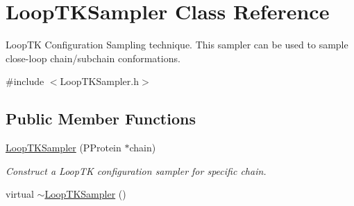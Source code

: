 \hypertarget{classLoopTKSampler}{\section{Loop\-T\-K\-Sampler Class Reference}
\label{classLoopTKSampler}
}


Loop\-T\-K Configuration Sampling technique. This sampler can be used to sample close-\/loop chain/subchain conformations.  




{\ttfamily \#include $<$Loop\-T\-K\-Sampler.\-h$>$}

\subsection*{Public Member Functions}
\begin{DoxyCompactItemize}
\item 
\hypertarget{classLoopTKSampler_a6c7e16dacc972e8ca47cf16e87a72721}{\hyperlink{classLoopTKSampler_a6c7e16dacc972e8ca47cf16e87a72721}{Loop\-T\-K\-Sampler} (P\-Protein $\ast$chain)}\label{classLoopTKSampler_a6c7e16dacc972e8ca47cf16e87a72721}

\begin{DoxyCompactList}\small\item\em Construct a Loop\-T\-K configuration sampler for specific chain. \end{DoxyCompactList}\item 
\hypertarget{classLoopTKSampler_a9c48f59f8fbf53a00d567bd04e555352}{virtual \hyperlink{classLoopTKSampler_a9c48f59f8fbf53a00d567bd04e555352}{$\sim$\-Loop\-T\-K\-Sampler} ()}\label{classLoopTKSampler_a9c48f59f8fbf53a00d567bd04e555352}


\end{DoxyCompactItemize}
